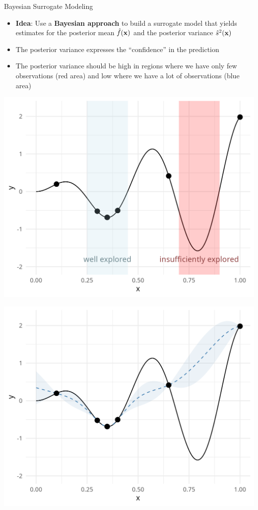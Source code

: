 \documentclass[11pt,compress,t,notes=noshow, xcolor=table]{beamer}
\begin{document}
\begin{vbframe}{Bayesian Surrogate Modeling}
\begin{itemize}
\item \textbf{Idea}: Use a \textbf{Bayesian approach} to build a surrogate model that yields estimates for the posterior mean $\hat{f}(\mathbf{x})$ and the posterior variance $\hat{s}^2(\mathbf{x})$
\item The posterior variance expresses the \enquote{confidence} in the prediction
\item The posterior variance should be high in regions where we have only few observations (red area) and low where we have a lot of observations (blue area)
\end{itemize}
\begin{minipage}[b]{0.45\textwidth}
  \includegraphics[width = \textwidth]{figure_man/bayesian_loop_0.png}
\end{minipage}
\hfill
\begin{minipage}[b]{0.45\textwidth}
  \includegraphics[width = \textwidth]{figure_man/bayesian_loop_1.png}
\end{minipage}


\end{vbframe}
\end{document}

